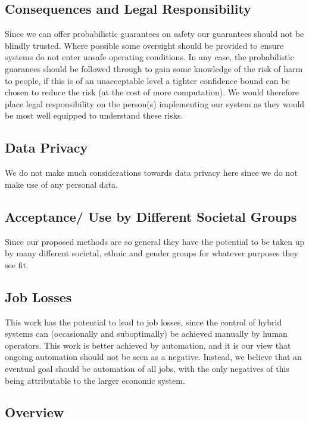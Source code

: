 \documentclass[twoside,twocolumn]{article}
\begin{document}
\subsection{Consequences and Legal Responsibility}
\label{subsec:legal}

Since we can offer probabilistic guarantees on safety our guarantees should not be blindly trusted. Where possible some oversight should be provided to ensure systems do not enter unsafe operating conditions. In any case, the probabilistic guaranees should be followed through to gain some knowledge of the risk of harm to people, if this is of an unacceptable level a tighter confidence bound can be chosen to reduce the risk (at the cost of more computation). We would therefore place legal responsibility on the person(s) implementing our system as they would be most well equipped to understand these risks.

\subsection{Data Privacy}

We do not make much considerations towards data privacy here since we do not make use of any personal data.

\subsection{Acceptance/ Use by Different Societal Groups}

Since our proposed methods are so general they have the potential to be taken up by many different societal, ethnic and gender groups for whatever purposes they see fit.

\subsection{Job Losses}

This work has the potential to lead to job losses, since the control of hybrid systems can (occasionally and suboptimally) be achieved manually by human operators. This work is better achieved by automation, and it is our view that ongoing automation should not be seen as a negative. Instead, we believe that an eventual goal should be automation of all jobs, with the only negatives of this being attributable to the larger economic system.

\subsection{Overview}
\end{document}
